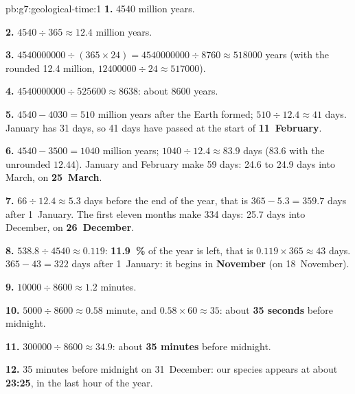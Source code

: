 \begin{solution}{pb:g7:geological-time:1}
\textbf{1.} \num{4540} million years.

\textbf{2.} $4540 \div 365 \approx 12.4$ million years.

\textbf{3.} $\num{4540000000} \div (365 \times 24) = \num{4540000000}
\div 8760 \approx \num{518000}$ years (with the rounded \num{12.4}
million, $\num{12400000} \div 24 \approx \num{517000}$).

\textbf{4.} $\num{4540000000} \div \num{525600} \approx 8638$: about
\num{8600} years.

\textbf{5.} $4540 - 4030 = 510$ million years after the Earth formed;
$510 \div 12.4 \approx 41$ days. January has 31 days, so 41 days have
passed at the start of \textbf{11~February}.

\textbf{6.} $4540 - 3500 = 1040$ million years; $1040 \div 12.4 \approx
83.9$ days (83.6 with the unrounded $12.44$). January and February make
59 days: 24.6 to 24.9 days into March, on \textbf{25~March}.

\textbf{7.} $66 \div 12.4 \approx 5.3$ days before the end of the year,
that is $365 - 5.3 = 359.7$ days after 1~January. The first eleven
months make 334 days: 25.7 days into December, on \textbf{26~December}.

\textbf{8.} $538.8 \div 4540 \approx 0.119$: \textbf{11.9~\%} of the
year is left, that is $0.119 \times 365 \approx 43$ days. $365 - 43 =
322$ days after 1~January: it begins in \textbf{November} (on
18~November).

\textbf{9.} $\num{10000} \div 8600 \approx 1.2$ minutes.

\textbf{10.} $5000 \div 8600 \approx 0.58$ minute, and $0.58 \times 60
\approx 35$: about \textbf{35 seconds} before midnight.

\textbf{11.} $\num{300000} \div 8600 \approx 34.9$: about \textbf{35
minutes} before midnight.

\textbf{12.} 35 minutes before midnight on 31~December: our species
appears at about \textbf{23:25}, in the last hour of the year.
\end{solution}
